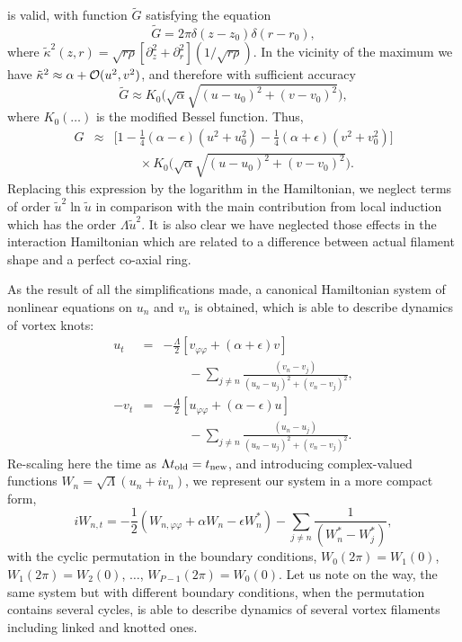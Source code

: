 \documentclass[pra,twocolumn,showpacs]{revtex4}
\begin{document}
is valid, with function $\tilde G$ satisfying the equation 
\begin{equation}
[-\partial^2_z-\partial^2_r +\tilde\kappa^2(z,r)]\tilde G=2\pi\delta(z-z_0)\delta(r-r_0),
\end{equation}
where $\tilde\kappa^2(z,r)=\sqrt{r\rho}[\partial^2_z+\partial^2_r](1/\sqrt{r\rho})$. In the vicinity 
of the maximum we have $\tilde\kappa^2\approx\alpha+{\cal O}(u^2,v^2)$, and therefore with sufficient
accuracy 
$$
\tilde G\approx K_0\Big(\sqrt{\alpha}\sqrt{(u-u_0)^2+(v-v_0)^2}\Big),
$$ 
where $K_0(\dots)$ is the modified Bessel function. Thus, 
\begin{eqnarray}
G&\approx&\Big[1-\frac{1}{4}(\alpha-\epsilon)(u^2+u_0^2)-\frac{1}{4}(\alpha+\epsilon)(v^2+v_0^2)\Big]
\nonumber\\
&&\qquad \times K_0\Big(\sqrt{\alpha}\sqrt{(u-u_0)^2+(v-v_0)^2}\Big).
\end{eqnarray}
Replacing this expression by the logarithm in the Hamiltonian, we neglect terms of order 
$\tilde u^2\ln \tilde u$ in comparison with the main contribution from local induction which 
has the order $\Lambda \tilde u^2$. It is also clear we have neglected those effects in 
the interaction Hamiltonian which are related to a difference between actual filament shape and 
a perfect co-axial ring.

As the result of all the simplifications made, a canonical Hamiltonian system of nonlinear equations
on $u_n$ and $v_n$ is obtained, which is able to describe dynamics of vortex knots:
\begin{eqnarray}
u_t&=&-\frac{\Lambda}{2}[v_{\varphi\varphi}+(\alpha+\epsilon)v]\nonumber\\
&&\qquad-\sum_{j\neq n}\frac{(v_n-v_j)}{(u_n-u_j)^2+(v_n-v_j)^2},\\
-v_t&=&-\frac{\Lambda}{2}[u_{\varphi\varphi}+(\alpha-\epsilon)u]\nonumber\\
&&\qquad-\sum_{j\neq n}\frac{(u_n-u_j)}{(u_n-u_j)^2+(v_n-v_j)^2}.
\end{eqnarray}
Re-scaling here the time as $\Lambda t_{\rm old}= t_{\rm new}$, and introducing complex-valued functions
$W_n=\sqrt{\Lambda}(u_n+iv_n)$, we represent our system in a more compact form,
\begin{equation}
iW_{n,t}=-\frac{1}{2}(W_{n,\varphi\varphi}+\alpha W_n-\epsilon W^*_n)
-\sum_{j\neq n}\frac{1}{(W^*_n-W^*_j)},
\label{W_t}
\end{equation}
with the cyclic permutation in the boundary conditions, $W_0(2\pi)=W_1(0)$, $W_1(2\pi)=W_2(0)$, 
$\dots$, $W_{P-1}(2\pi)=W_0(0)$. Let us note on the way, the same system but with different 
boundary conditions, when the permutation contains several cycles,
is able to describe dynamics of several vortex filaments including linked and knotted ones.
\end{document}
